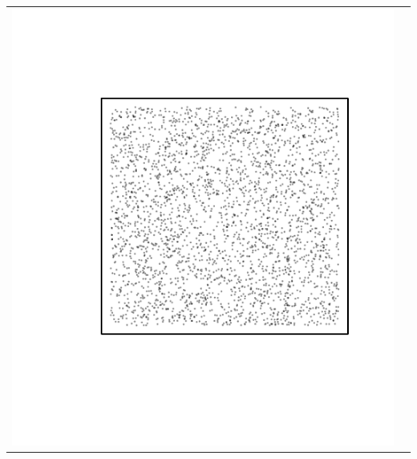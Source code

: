 \documentclass{article}\usepackage{graphicx, color}
\makeatletter
\def\maxwidth{ %
  \ifdim\Gin@nat@width>\linewidth
    \linewidth
  \else
    \Gin@nat@width
  \fi
}
\newenvironment{knitrout}{}{} %
\makeatother
\begin{document}
\vspace*{-1.75in}
\begin{tabular}{cc}
\begin{knitrout}
\definecolor{shadecolor}{rgb}{0.969, 0.969, 0.969}\color{fgcolor}\includegraphics[width=\maxwidth]{figure/unnamed-chunk-37} 
\end{knitrout}


\end{tabular}
\end{document}
